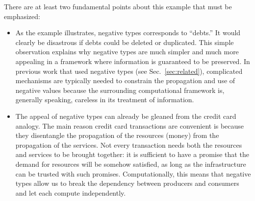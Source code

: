 \documentclass[preprint]{sigplanconf}
\begin{document}
There are at least two fundamental points about this example that must be
emphasized:
\begin{itemize}
\item As the example illustrates, negative types corresponds to ``debts.''
  It would clearly be disastrous if debts could be deleted or
  duplicated. This simple observation explains why negative types are much
  simpler and much more appealing in a framework where information is
  guaranteed to be preserved. In previous work that used negative types (see
  Sec.~\ref{sec:related}), complicated mechanisms are typically needed to
  constrain the propagation and use of negative values because the
  surrounding computational framework is, generally speaking, careless in its
  treatment of information.
\item The appeal of negative types can already be gleaned from the credit
  card analogy. The main reason credit card transactions are convenient is
  because they disentangle the propagation of the resources (money) from the
  propagation of the services. Not every transaction needs both the resources
  and services to be brought together: it is sufficient to have a promise
  that the demand for resources will be somehow satisfied, as long as the
  infrastructure can be trusted with such promises. Computationally, this
  means that negative types allow us to break the dependency between
  producers and consumers and let each compute independently.
\end{itemize}
\end{document}
